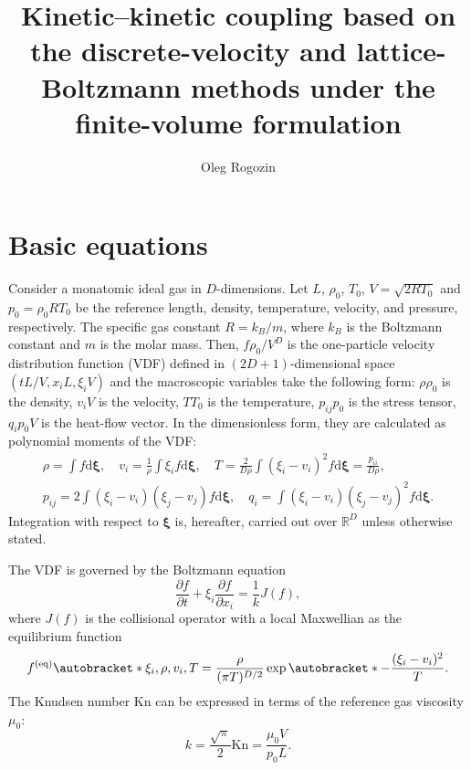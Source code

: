 \documentclass{article}
\title{Kinetic--kinetic coupling based on the discrete-velocity and lattice-Boltzmann methods under the finite-volume formulation}
\author{Oleg Rogozin}
\newcommand{\Kn}{\mathrm{Kn}}
\newcommand{\dd}{\mathrm{d}}
\newcommand{\pder}[2][]{\frac{\partial#1}{\partial#2}}
\DeclarePairedDelimiter\autobracket()       %
\newcommand{\br}[1]{\autobracket*{#1}}
\newcommand{\dxi}{\boldsymbol{\dd\xi}}
\newcommand{\bxi}{{\boldsymbol{\xi}}}
\newcommand{\equil}[1]{#1^\mathrm{(eq)}}
\newcommand{\refer}[1]{#1_0}
\begin{document}
\maketitle
\tableofcontents

\section{Basic equations}\label{sec:equations}

Consider a monatomic ideal gas in \(D\)-dimensions.
Let \(L\), \(\refer\rho\), \(\refer{T}\), \(V = \sqrt{2R\refer{T}}\) and \(\refer{p} = \refer{\rho}R\refer{T}\) be
the reference length, density, temperature, velocity, and pressure, respectively.
The specific gas constant \(R = k_B/m\), where \(k_B\) is the Boltzmann constant and \(m\) is the molar mass.
Then, \(f\refer{\rho}/V^D\) is the one-particle velocity distribution function (VDF)
defined in \((2D+1)\)-dimensional space \((tL/V, x_iL, \xi_iV)\) and
the macroscopic variables take the following form:
\(\rho\refer{\rho}\) is the density, \(v_iV\) is the velocity, \(T\refer{T}\) is the temperature,
\(p_{ij}\refer{p}\) is the stress tensor, \(q_i\refer{p}V\) is the heat-flow vector.
In the dimensionless form, they are calculated as polynomial moments of the VDF:
\begin{equation}\label{eq:macro}
    \begin{gathered}
    \rho = \int f \dxi, \quad
    v_i = \frac1{\rho} \int \xi_i f \dxi, \quad
    T = \frac{2}{D\rho}\int(\xi_i-v_i)^2 f \dxi = \frac{p_{ii}}{D\rho}, \\
    p_{ij} = 2 \int(\xi_i-v_i)(\xi_j-v_j) f \dxi, \quad
    q_i = \int(\xi_i-v_i)(\xi_j-v_j)^2 f \dxi.
    \end{gathered}
\end{equation}
Integration with respect to \(\bxi\) is, hereafter, carried out over \(\mathbb{R}^D\) unless otherwise stated.

The VDF is governed by the Boltzmann equation
\begin{equation}\label{eq:Boltzmann}
    \pder[f]{t} + \xi_i\pder[f]{x_i} = \frac1kJ(f),
\end{equation}
where \(J(f)\) is the collisional operator with a local Maxwellian as the equilibrium function
\begin{equation}\label{eq:equilibrium}
    \equil{f}\br{\xi_i,\rho,v_i,T} = \frac{\rho}{(\pi T)^{D/2}}\exp\br{-\frac{(\xi_i - v_i)^2}T}.
\end{equation}
The Knudsen number \(\Kn\) can be expressed in terms of the reference gas viscosity \(\refer\mu\):
\begin{equation}\label{eq:Knudsen_number}
    k = \frac{\sqrt\pi}2\Kn = \frac{\refer\mu V}{\refer{p}L}.
\end{equation}
\end{document}
